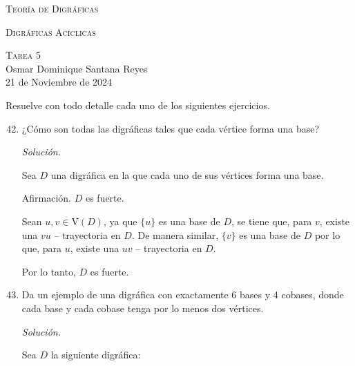 \documentclass[12pt, fleqn]{article}
\newcommand{\V}[1]{\mathrm{V} \! \left( #1 \right)}
\newcommand{\tray}[2]{$ #1 #2 $ -- trayectoria}
\begin{document}
	\begin{center}
		{\huge \textsc{Teoría de Digráficas}}
	
		{\Large \textsc{Digráficas Acíclicas}}
	
		{\Large \textsc{Tarea 5}} \\
		Osmar Dominique Santana Reyes \\
		21 de Noviembre de 2024
	\end{center} \vspace{3mm}

	Resuelve con todo detalle cada uno de los siguientes ejercicios.

	\begin{enumerate}
		\setcounter{enumi}{41}
		\item ¿Cómo son todas las digráficas tales que cada vértice forma una base?
		
		\emph{Solución.}

		Sea $D$ una digráfica en la que cada uno de sus vértices forma una base.

		Afirmación. $D$ es fuerte.

		Sean $ u,v \in \V{D} $, ya que $ \lbrace u \rbrace $ es una base de $D$, se tiene que, para $v$, existe una \tray{v}{u} en $D$. De manera similar, $ \lbrace v \rbrace $ es una base de $D$ por lo que, para $u$, existe una \tray{u}{v} en $D$.

		Por lo tanto, $D$ es fuerte. 

		\vspace{3mm}
		
		\item Da un ejemplo de una digráfica con exactamente 6 bases y 4 cobases, donde cada base y cada cobase tenga por lo menos dos vértices.
		
		\emph{Solución.}

		Sea $D$ la siguiente digráfica:


\end{enumerate}
\end{document}
